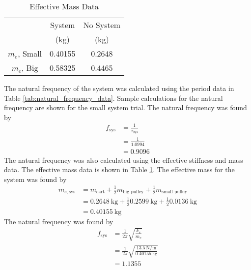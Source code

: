 \begin{table}[H]
    \centering
    \caption{Effective Mass Data}
    \label{tab:effective_stiffness_mass}
    \begin{tabular}{ccc}
    \toprule
        & System & No System \\
        & (kg) & (kg) \\
        \midrule
        $m_e$, Small & 0.40155 & 0.2648 \\
        $m_e$, Big & 0.58325 & 0.4465 \\
        \bottomrule
    \end{tabular}
\end{table}
The natural frequency of the system was calculated using the period data in Table \ref{tab:natural_frequency_data}. Sample calculations for the natural frequency are shown for the small system trial. The natural frequency was found by
\begin{align*}
    f_{\text{sys}} &= \frac{1}{\tau_{\text{sys}}} \\
    &= \frac{1}{1.0994} \\
    &= \boxed{0.9096}
\end{align*}
The natural frequency was also calculated using the effective stiffness and mass data. The effective mass data is shown in Table \ref{tab:effective_stiffness_mass}. The effective mass for the system was found by 
\begin{align*}
    m_{e, \text{sys}} &= m_{\text{cart}} + \frac{1}{2} m_{\text{big pulley}} + \frac{1}{2} m_{\text{small pulley}} \\
    &= \qty{0.2648}{\kilo\gram} + \frac{1}{2} \qty{0.2599}{\kilo\gram} + \frac{1}{2} \qty{0.0136}{\kilo\gram} \\
    &= \qty{0.40155}{\kilo\gram}
\end{align*}
The natural frequency was found by 
\begin{align*}
    f_{\text{sys}} &= \frac{1}{2\pi} \sqrt{\frac{k_e}{m_e}} \\
    &= \frac{1}{2\pi} \sqrt{\frac{\qty{13.5}{\newton\per\meter}}{\qty{0.40155}{\kilo\gram}}} \\
    &= \boxed{1.1355}
\end{align*}

